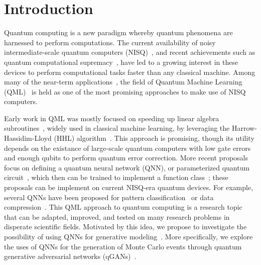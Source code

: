 \documentclass[twocolumn,preprintnumbers,superscriptaddress]{revtex4-2}
\begin{document}
\maketitle

\section{Introduction}

Quantum computing is a new paradigm whereby quantum phenomena are harnessed to perform computations. The current availability of noisy intermediate-scale quantum computers (NISQ)~\cite{nisq}, and recent achievements such as quantum computational supremacy~\cite{supremacy, zhong2020quantum}, have led to a growing interest in these devices to perform computational tasks faster than any classical machine. Among many of the near-term applications~\cite{cerezo2021variational, bharti2021noisy}, the field of Quantum Machine Learning (QML)~\cite{biamonte2017quantum, schuld2018supervised} is held as one of the most promising approaches to make use of NISQ computers.

Early work in QML was mostly focused on speeding up linear algebra subroutines~\cite{wiebe2012quantum, lloyd:2013ml, Rebentrost:2014svm, kerenidis2020quantum}, widely used in classical machine learning, by leveraging the Harrow-Hassidim-Lloyd (HHL) algorithm~\cite{harrow2009quantum}. This approach is promising, though its utility depends on the existance of large-scale quantum computers with low gate errors and enough qubits to perform quantum error correction. More recent proposals focus on defining a quantum neural network (QNN), or parameterized quantum circuit~\cite{benedetti2019parameterized, sim2019expressibility, bravo2020scaling}, which then can be trained to implement a function class~\cite{schuld2021effect, goto2021universal, perez2021one}; these proposals can be implement on current NISQ-era quantum devices. For example, several QNNs have been proposed for pattern classification~\cite{havlivcek2019supervised, Schuld:2020circuit, perezsalinas:2020reuploading, dutta2021realization} or data compression~\cite{romero2017quantum, pepper2019experimental, bravo2021quantum, cao2021noise}. This QML approach to quantum computing is a research topic that can be adapted, improved, and tested on many research problems in disperate scientific fields. Motivated by this idea, we propose to investigate the possibility of using QNNs for generative modeling~\cite{benedetti2019generative, hamilton2019generative, coyle2020born}. More specifically, we explore the uses of QNNs for the generation of Monte Carlo events through quantum generative adversarial networks (qGANs)~\cite{dallaire2018quantum, lloyd2018quantum}.
\end{document}

